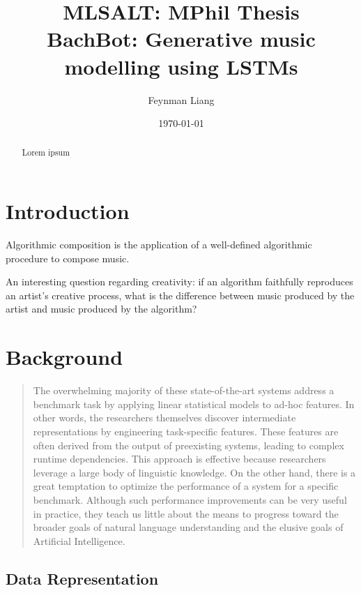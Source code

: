 \documentclass[a4paper,oneside,reqno,onecolumn]{amsart}
\newcommand{\authorname}{Feynman Liang}
\newcommand{\coursename}{MLSALT: MPhil Thesis}
\newcommand{\assignmentname}{BachBot: Generative music modelling using LSTMs}
\begin{document}
\title{\coursename\\\assignmentname}
\author{\authorname}
\address[A1]{Churchill College}
\date{\today}

\begin{abstract}
Lorem ipsum
\end{abstract}

\maketitle

\tableofcontents

\section{Introduction}

Algorithmic composition is the application of a well-defined algorithmic
procedure to compose music.

An interesting question regarding creativity: if an algorithm faithfully reproduces
an artist's creative process, what is the difference between music produced by the artist
and music produced by the algorithm?

\section{Background}

\begin{quote}
    The overwhelming majority of these state-of-the-art systems address a benchmark
task by applying linear statistical models to ad-hoc features. In other words, the
researchers themselves discover intermediate representations by engineering task-specific
features. These features are often derived from the output of preexisting systems, leading
to complex runtime dependencies. This approach is effective because researchers leverage
a large body of linguistic knowledge. On the other hand, there is a great temptation to
optimize the performance of a system for a specific benchmark. Although such performance
improvements can be very useful in practice, they teach us little about the means to progress
toward the broader goals of natural language understanding and the elusive goals of Artificial
Intelligence.
\end{quote}\cite{Collobert2011}

\subsection{Data Representation}
\end{document}
